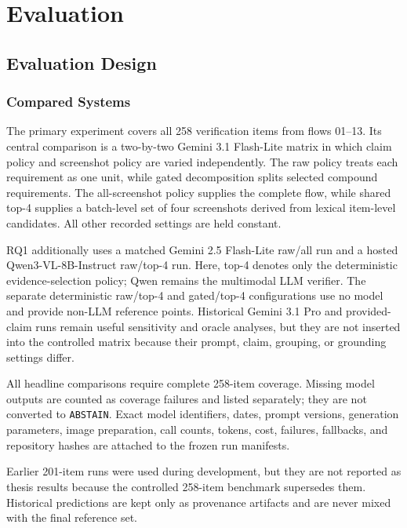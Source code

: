 \chapter{Evaluation}\label{evaluation}

\section{Evaluation Design}\label{evaluation-design}

\subsection{Compared Systems}\label{compared-systems}

The primary experiment covers all 258 verification items from flows 01--13.
Its central comparison is a two-by-two Gemini 3.1 Flash-Lite matrix in which
claim policy and screenshot policy are varied independently. The raw policy
treats each requirement as one unit, while gated decomposition splits selected
compound requirements. The all-screenshot policy supplies the complete flow,
while shared top-4 supplies a batch-level set of four screenshots derived from
lexical item-level candidates. All
other recorded settings are held constant.

RQ1 additionally uses a matched Gemini 2.5 Flash-Lite raw/all run and a hosted
Qwen3-VL-8B-Instruct raw/top-4 run. Here, top-4 denotes only the deterministic
evidence-selection policy; Qwen remains the multimodal LLM verifier. The separate
deterministic raw/top-4 and gated/top-4 configurations use no model and provide
non-LLM reference points. Historical Gemini
3.1 Pro and provided-claim runs remain useful sensitivity and oracle analyses,
but they are not inserted into the controlled matrix because their prompt,
claim, grouping, or grounding settings differ.

All headline comparisons require complete 258-item coverage. Missing model
outputs are counted as coverage failures and listed separately; they are not
converted to \texttt{ABSTAIN}. Exact model identifiers, dates, prompt versions,
generation parameters, image preparation, call counts, tokens, cost, failures,
fallbacks, and repository hashes are attached to the frozen run manifests.

Earlier 201-item runs were used during development, but they are not reported
as thesis results because the controlled 258-item benchmark supersedes them.
Historical predictions are kept only as provenance artifacts and are never
mixed with the final reference set.

